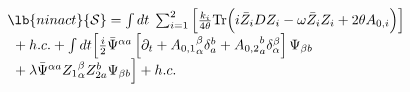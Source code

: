 \begin{equation}
\begin{array}{l}
\lb{ninact}
{\cal S} =\int dt\;
\sum_{i=1}^{2}\Big[ {\frac{k_{i}}{4\theta }}
{\rm{Tr}}\Big( i{ \bar{Z}_{i}}DZ_{i}-
\omega {\bar{Z}_{i}}Z_{i}+2\theta A_{0,i}\Big) 
\Big] \\ 
\mbox{ } +h.c. +\int dt
\Big[\frac{i}{2}{\bar{\Psi}}^{{\alpha}{a}}
\left[\partial _{t}+{A_{0,1}}_{\alpha }^{{\beta}} 
\delta _{a}^{{b }}+{A_{0,2}}_{a}^{{b}} 
\delta _{\alpha }^{{\beta }}\right]  
\Psi _{\beta b}\\ 
\mbox{ } 
+\lambda {\bar{\Psi}}^{{\alpha}{a}}
{Z_{1} }_{\alpha }^{{\beta}} Z_{2a}^{{b}}
\Psi_{\beta b}\Big]+ h.c.
\end{array}
\end{equation}


